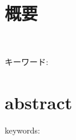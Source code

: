 \chapter*{概要}
\thispagestyle{empty}
%
\begin{center}
  \scalebox{1.5}{AIFormulaにおける経路追従ソフトウェアの開発}\\
\end{center}
\vspace{1.0zh}
%

%
% 
%
%
%
%
%
%
%
%
%
%
%
%
%

キーワード: 
%
\newpage
\chapter*{abstract}
\thispagestyle{empty}
%
\begin{center}
  \scalebox{1.3}{title}
\end{center}
\vspace{1.0zh}
%


keywords: 
